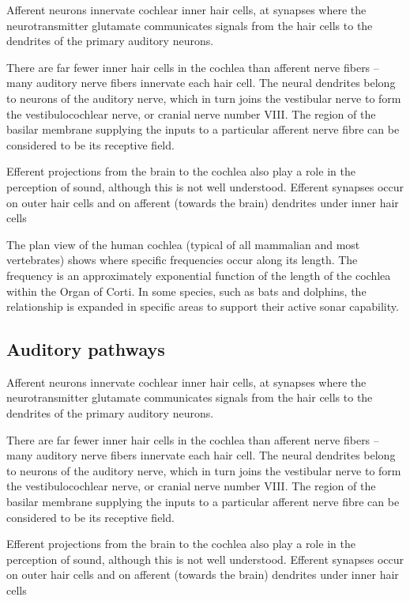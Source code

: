 Afferent neurons innervate cochlear inner hair cells, at synapses where the neurotransmitter glutamate communicates signals from the hair cells to the dendrites of the primary auditory neurons.

There are far fewer inner hair cells in the cochlea than afferent nerve fibers -- many auditory nerve fibers innervate each hair cell. The neural dendrites belong to neurons of the auditory nerve, which in turn joins the vestibular nerve to form the vestibulocochlear nerve, or cranial nerve number VIII. The region of the basilar membrane supplying the inputs to a particular afferent nerve fibre can be considered to be its receptive field.

Efferent projections from the brain to the cochlea also play a role in the perception of sound, although this is not well understood. Efferent synapses occur on outer hair cells and on afferent (towards the brain) dendrites under inner hair cells

The plan view of the human cochlea (typical of all mammalian and most vertebrates) shows where specific frequencies occur along its length. The frequency is an approximately exponential function of the length of the cochlea within the Organ of Corti. In some species, such as bats and dolphins, the relationship is expanded in specific areas to support their active sonar capability.

\hypertarget{auditory-pathways}{%
\subsection{Auditory pathways}\label{auditory-pathways}}

Afferent neurons innervate cochlear inner hair cells, at synapses where the neurotransmitter glutamate communicates signals from the hair cells to the dendrites of the primary auditory neurons.

There are far fewer inner hair cells in the cochlea than afferent nerve fibers -- many auditory nerve fibers innervate each hair cell. The neural dendrites belong to neurons of the auditory nerve, which in turn joins the vestibular nerve to form the vestibulocochlear nerve, or cranial nerve number VIII. The region of the basilar membrane supplying the inputs to a particular afferent nerve fibre can be considered to be its receptive field.

Efferent projections from the brain to the cochlea also play a role in the perception of sound, although this is not well understood. Efferent synapses occur on outer hair cells and on afferent (towards the brain) dendrites under inner hair cells

